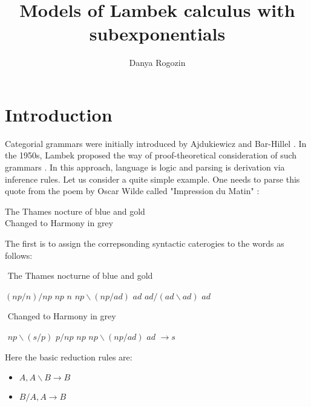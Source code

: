 \documentclass[a4paper]{article}
\date{}
\author[1,2]{Danya Rogozin}
\affil[1]{Lomonosov Moscow State University}
\affil[2]{Serokell O\"{U}}
\title{Models of Lambek calculus with subexponentials}
\theoremstyle{defin}
\theoremstyle{theorem}
\theoremstyle{prop}
\theoremstyle{lemma}
\theoremstyle{ex}
\theoremstyle{col}
\begin{document}
\maketitle

\begin{abstract}
\end{abstract}

\section{Introduction}

Categorial grammars were initially introduced by Ajdukiewicz and Bar-Hillel \cite{Ajd} \cite{Bar}.
In the 1950s, Lambek proposed the way of proof-theoretical consideration of such grammars \cite{Lambek}. In this approach, language is logic and parsing is derivation via inference rules. Let us consider a quite simple example. One needs to parse this quote from the poem by Oscar Wilde called "Impression du Matin" \cite{Wilde}:

\begin{center}
The Thames nocture of blue and gold \\
Changed to Harmony in grey
\end{center}

The first is to assign the correpsonding syntactic caterogies to the words as follows:

\vspace{\baselineskip}

$ $ \:\:\:\: The \:\:\:\: Thames nocturne \:\:\:\:\:\: of \:\:\:\:\:\:\:\:\:\: blue \:\:\:\:\:\:\: and \:\:\:\:\:\:\:\: gold

$(np / n) / np$ \:\:\:\:\: $np$ \:\:\:\:\:\:\:\:\: $n$ \:\:\:\:\:\: $np \backslash (np / ad)$ \: $ad$ \:\: $ad / (ad \backslash ad)$ \: $ad$

\vspace{\baselineskip}

$ $ \: Changed \:\:\:\: to \:\:\:\: Harmony \:\:\:\:\:\:\:\:\:\: in \:\:\:\:\:\:\:\:\:\:\: grey

$ $ \: $np \backslash (s / p)$ \:\: $p / np$ \:\:\:\:\:\: $np$ \:\:\:\:\:\:\:\: $np \backslash (np / ad)$ \:\: $ad$ \:\:\:\:\:\: $\rightarrow s$

\vspace{\baselineskip}

Here the basic reduction rules are:

\begin{itemize}
  \item $A, A \backslash B \to B$
  \item $B / A, A \to B$
\end{itemize}
\end{document}
